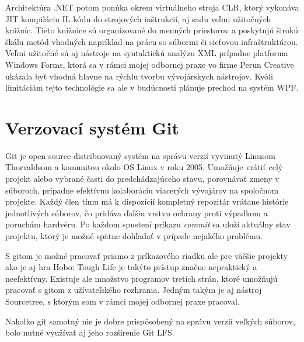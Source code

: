 \documentclass[slovak, bachelorpractice]{diploma}
\begin{document}
Architektúra .NET \cite{CSharpLang} potom ponúka okrem virtuálneho stroja CLR, ktorý vykonáva JIT kompiláciu IL kódu do strojových inštrukcií, aj sadu veľmi užitočných knižníc. Tieto knižnice sú organizované do menných priestorov a poskytujú širokú škálu metód vhodných napríklad na prácu so súbormi či sieťovou infraštruktúrou. Veľmi užitočné sú aj nástroje na syntaktickú analýzu XML prípadne platforma Windows Forms, ktorá sa v rámci mojej odbornej praxe vo firme Perun Creative ukázala byť vhodná hlavne na rýchlu tvorbu vývojárskych nástrojov. Kvôli limitáciám tejto technológie sa ale v budúcnosti plánuje prechod na systém WPF.
\section{Verzovací systém Git}
\label{sec:Git}
Git \cite{ProGit} je open source distribuovaný systém na správu verzií vyvinutý Linusom Thorvaldsom a komunitou okolo OS Linux v roku 2005. Umožňuje vrátiť celý projekt alebo vybrané časti do predchádzajúceho stavu, porovnávať zmeny v súboroch, prípadne efektívnu kolaboráciu viacerých vývojárov na spoločnom projekte. Každý člen tímu má k dispozícií kompletný repozitár vrátane histórie jednotlivých súborov, čo pridáva ďalšiu vrstvu ochrany proti výpadkom a poruchám hardvéru. Po každom spustení príkazu \textit{commit} sa uloží aktuálny stav projektu, ktorý je možné spätne dohľadať v prípade nejakého problému.

S gitom je možné pracovať priamo z príkazového riadku ale pre väčšie projekty ako je aj hra Hobo: Tough Life je takýto prístup značne nepraktický a neefektívny. Existuje ale množstvo programov tretích strán, ktoré umožňujú pracovať s gitom z užívateľského rozhrania. Jedným takým je aj nástroj Sourcetree, s ktorým som v rámci mojej odbornej praxe pracoval.

Nakoľko git samotný nie je dobre prispôsobený na správu verzií veľkých súborov, bolo nutné využívať aj jeho rozšírenie Git LFS. 
\end{document}
